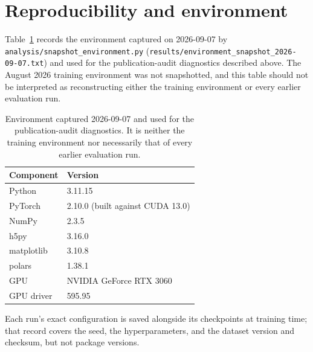 \documentclass[11pt]{article}
\begin{document}
\section{Reproducibility and environment}
\label{app:repro}
Table~\ref{tab:env} records the environment captured on 2026-09-07 by
\texttt{analysis/snapshot\_environment.py}
(\texttt{results/environment\_snapshot\_2026-09-07.txt}) and used for the publication-audit
diagnostics described above. The August 2026 training environment was not snapshotted, and this table
should not be interpreted as reconstructing either the training environment or every earlier
evaluation run.

\begin{table}[H]
\centering
\small
\caption{Environment captured 2026-09-07 and used for the publication-audit diagnostics. It is
neither the training environment nor necessarily that of every earlier evaluation run.}
\label{tab:env}
\begin{tabular}{ll}
\toprule
Component & Version \\
\midrule
Python & 3.11.15 \\
PyTorch & 2.10.0 (built against CUDA 13.0) \\
NumPy & 2.3.5 \\
h5py & 3.16.0 \\
matplotlib & 3.10.8 \\
polars & 1.38.1 \\
GPU & NVIDIA GeForce RTX 3060 \\
GPU driver & 595.95 \\
\bottomrule
\end{tabular}
\end{table}

Each run's exact configuration is saved alongside its checkpoints at training time; that record covers
the seed, the hyperparameters, and the dataset version and checksum, but not package versions.
\end{document}

